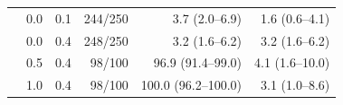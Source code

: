 \begin{table}[tbp]
{\begin{tabular}{lrrrrr}
\midrule
{} & 0.0 & 0.1 & 244/250 & 3.7 (2.0--6.9) & 1.6 (0.6--4.1) \\
 & 0.0 & 0.4 & 248/250 & 3.2 (1.6--6.2) & 3.2 (1.6--6.2) \\
 & 0.5 & 0.4 & 98/100 & 96.9 (91.4--99.0) & 4.1 (1.6--10.0) \\
 & 1.0 & 0.4 & 98/100 & 100.0 (96.2--100.0) & 3.1 (1.0--8.6) \\
    \bottomrule
  \end{tabular}
  }
\end{table}
